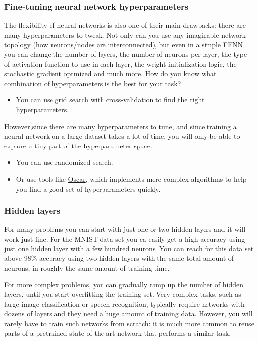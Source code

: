 \documentclass{beamer}
\begin{document}
\begin{frame}
\frametitle{Fine-tuning neural network hyperparameters}

The flexibility of neural networks is also one of their main
drawbacks: there are many hyperparameters to tweak. Not only can you
use any imaginable network topology (how neurons/nodes are
interconnected), but even in a simple FFNN you can change the number
of layers, the number of neurons per layer, the type of activation
function to use in each layer, the weight initialization logic, the
stochastic gradient optmized and much more. How do you know what
combination of hyperparameters is the best for your task?

\begin{itemize}
\item You can use grid search with cross-validation to find the right hyperparameters.
\end{itemize}

\noindent
However,since there are many hyperparameters to tune, and since
training a neural network on a large dataset takes a lot of time, you
will only be able to explore a tiny part of the hyperparameter space.

\begin{itemize}
\item You can use randomized search.

\item Or use tools like \href{{http://oscar.calldesk.ai/}}{Oscar}, which implements more complex algorithms to help you find a good set of hyperparameters quickly.  
\end{itemize}

\noindent
\end{frame}

\begin{frame}
\frametitle{Hidden layers}

For many problems you can start with just one or two hidden layers and
it will work just fine.  For the MNIST data set you ca easily get a
high accuracy using just one hidden layer with a few hundred neurons.
You can reach for this data set above 98\% accuracy using two hidden
layers with the same total amount of neurons, in roughly the same
amount of training time.

For more complex problems, you can gradually ramp up the number of
hidden layers, until you start overfitting the training set. Very
complex tasks, such as large image classification or speech
recognition, typically require networks with dozens of layers and they
need a huge amount of training data. However, you will rarely have to
train such networks from scratch: it is much more common to reuse
parts of a pretrained state-of-the-art network that performs a similar
task.
\end{frame}
\end{document}
